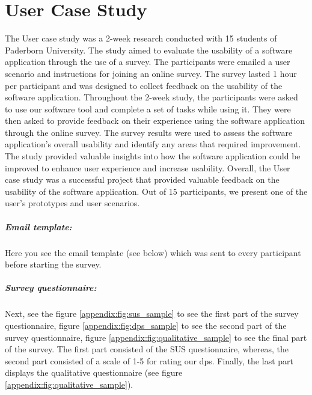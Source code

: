 \chapter{User Case Study}
\label{appendix:three:caseStudy}

\ifpdf
    \graphicspath{{Appendix3/Figs/}{Appendix3/Figs/}{Appendix3/Figs/}}
\else
    \graphicspath{{Appendix3/Figs/}{Appendix3/Figs/}}
\fi

The User case study was a 2-week research conducted with 15 students of Paderborn University. 
The study aimed to evaluate the usability of a software application through the use of a survey.
The participants were emailed a user scenario and instructions for joining an online survey. 
The survey lasted 1 hour per participant and was designed to collect feedback on the usability of the software application.
Throughout the 2-week study, the participants were asked to use our software tool and complete a set of tasks while using it. 
They were then asked to provide feedback on their experience using the software application through the online survey.
The survey results were used to assess the software application's overall usability and identify any areas that required improvement. 
The study provided valuable insights into how the software application could be improved to enhance user experience and increase usability. 
Overall, the User case study was a successful project that provided valuable feedback on the usability of the software application.
Out of 15 participants, we present one of the user's prototypes and user scenarios.

\paragraph{Email template:} Here you see the email template (see below) which was sent to every participant before starting the survey.

\paragraph{Survey questionnaire:} 
Next, see the figure \ref{appendix:fig:sus_sample} to see the first part of the survey questionnaire, figure \ref{appendix:fig:dps_sample} to see the second part of the survey questionnaire, figure \ref{appendix:fig:qualitative_sample} to see the final part of the survey.
The first part consisted of the SUS questionnaire, whereas, the second part consisted of a scale of 1-5 for rating our \ac{dp}s.
Finally, the last part displays the qualitative questionnaire (see figure \ref{appendix:fig:qualitative_sample}).

